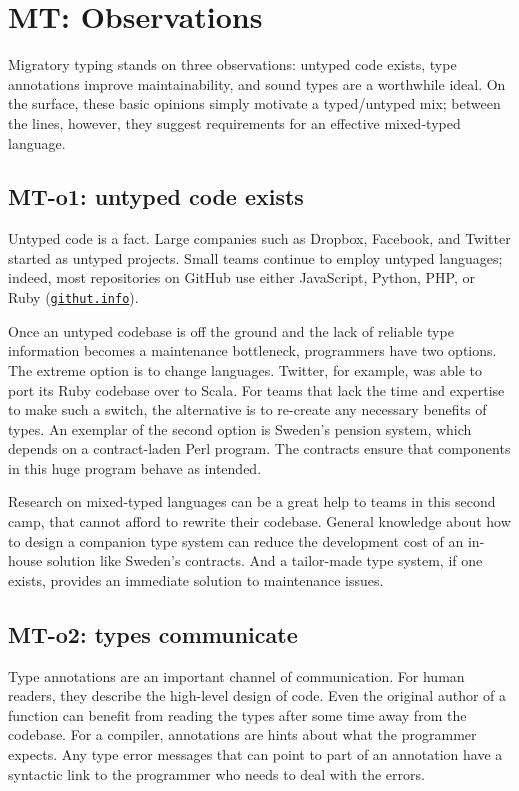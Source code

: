 \documentclass[ twoside,open=right,titlepage,numbers=noenddot,headinclude,%
                footinclude=true,cleardoublepage=empty,abstract=off,
                BCOR=5mm,paper=a4,fontsize=11pt,%
                ngerman,american,%
                parts,pdfspacing]{scrreprt}
\let\SOriginalthesubsubsection\thesubsubsection
\newcommand{\Ssubsection}[2]{\subsection[#1]{#2}\let\thesubsubsection\SOriginalthesubsubsection}
\newcommand{\Ssubsubsection}[2]{\subsubsection[#1]{#2}}
\newcommand{\Snolinkurl}[1]{\nolinkurl{#1}}
\renewcommand{\Ssubsection}[2]{\section[#1]{#2}}
\renewcommand{\Ssubsubsection}[2]{\subsection[#1]{#2}}
\begin{document}
\Ssubsection{MT: Observations}{MT: Observations}\label{t:x28part_x22secx3awhyx3aobservationsx22x29}

Migratory typing stands on three observations:
 untyped code exists,
 type annotations improve maintainability,
 and sound types are a worthwhile ideal.
On the surface, these basic opinions simply motivate a typed/untyped mix;
 between the lines, however,
 they suggest requirements for an effective mixed{-}typed language.

\Ssubsubsection{MT{-}o1: untyped code exists}{MT{-}o1: untyped code exists}\label{t:x28part_x22whyx3amtx2do1x22x29}

Untyped code is a fact.
Large companies such as Dropbox, Facebook, and Twitter started as
 untyped projects.
Small teams continue to employ untyped languages; indeed, most repositories on
 GitHub use either JavaScript, Python, PHP, or Ruby (\href{https://githut.info}{\Snolinkurl{githut.info}}).

Once an untyped codebase is off the ground and the lack of reliable type
 information becomes a maintenance bottleneck, programmers have two options.
The extreme option is to change languages.
Twitter, for example, was able to port its Ruby codebase over to Scala.
For teams that lack the time and expertise to make such a switch, the alternative
 is to re{-}create any necessary benefits of types.
An exemplar of the second option is Sweden{'}s pension system, which
 depends on a contract{-}laden Perl program.
The contracts ensure that components in this huge program behave as intended.

Research on mixed{-}typed languages can be a great help to teams in this second
 camp, that cannot afford to rewrite their codebase.
General knowledge about how to design a companion type system can reduce
 the development cost of an in{-}house solution like Sweden{'}s contracts.
And a tailor{-}made type system, if one exists, provides an immediate solution
 to maintenance issues.

\Ssubsubsection{MT{-}o2: types communicate}{MT{-}o2: types communicate}\label{t:x28part_x22whyx3amtx2do2x22x29}

Type annotations are an important channel of communication.
For human readers, they describe the high{-}level design of code.
Even the original author of a function can benefit from reading the types
 after some time away from the codebase.
For a compiler, annotations are hints about what the programmer expects.
Any type error messages that can point to part of an annotation
 have a syntactic link to the programmer who needs to deal with the errors.
\end{document}
